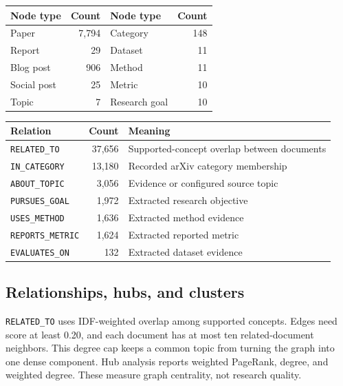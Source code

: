 \documentclass[10pt]{article}
\begin{document}
\begin{table}[h]
  \centering
  \small
  \begin{tabularx}{\linewidth}{Y r Y r}
    \toprule
    Node type & Count & Node type & Count \\
    \midrule
    Paper & 7,794 & Category & 148 \\
    Report & 29 & Dataset & 11 \\
    Blog post & 906 & Method & 11 \\
    Social post & 25 & Metric & 10 \\
    Topic & 7 & Research goal & 10 \\
    \bottomrule
  \end{tabularx}
\end{table}

\begin{table}[h]
  \centering
  \small
  \begin{tabularx}{\linewidth}{Y r Y}
    \toprule
    Relation & Count & Meaning \\
    \midrule
    \texttt{RELATED\_TO} & 37,656 & Supported-concept overlap between documents \\
    \texttt{IN\_CATEGORY} & 13,180 & Recorded arXiv category membership \\
    \texttt{ABOUT\_TOPIC} & 3,056 & Evidence or configured source topic \\
    \texttt{PURSUES\_GOAL} & 1,972 & Extracted research objective \\
    \texttt{USES\_METHOD} & 1,636 & Extracted method evidence \\
    \texttt{REPORTS\_METRIC} & 1,624 & Extracted reported metric \\
    \texttt{EVALUATES\_ON} & 132 & Extracted dataset evidence \\
    \bottomrule
  \end{tabularx}
\end{table}

\subsection{Relationships, hubs, and clusters}

\texttt{RELATED\_TO} uses IDF-weighted overlap among supported concepts. Edges
need score at least 0.20, and each document has at most ten related-document
neighbors. This degree cap keeps a common topic from turning the graph into one
dense component. Hub analysis reports weighted PageRank, degree, and weighted
degree. These measure graph centrality, not research quality.
\end{document}

